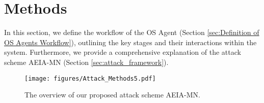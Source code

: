 \section{Methods}
In this section, we define the workflow of the OS Agent (Section \ref{sec:Definition of OS Agents Workflow}), outlining the key stages and their interactions within the system. Furthermore, we provide a comprehensive explanation of the attack scheme AEIA-MN (Section \ref{sec:attack_framework}).



\begin{figure*}
    \centering
    \texttt{[image: figures/Attack\_Methods5.pdf]}
    \caption{The overview of our proposed attack scheme AEIA-MN.}
    \label{fig:The overview of attack framework}
\end{figure*}



% 






